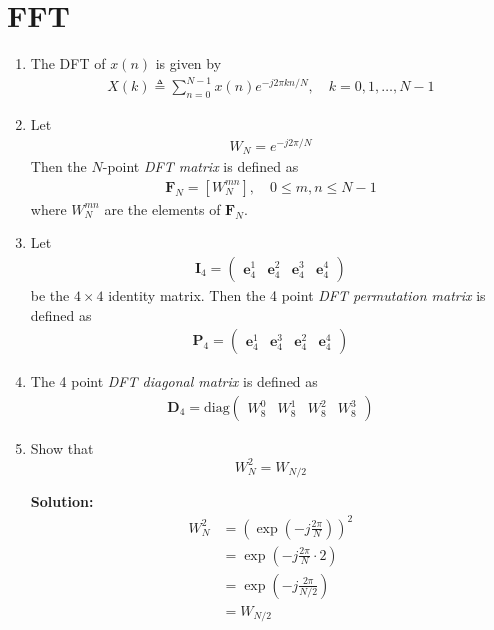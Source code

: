 \documentclass[journal,12pt,twocolumn]{IEEEtran}
\newcommand{\solution}{\noindent \textbf{Solution: }}
\providecommand{\brak}[1]{\ensuremath{\left(#1\right)}}
\providecommand{\sbrak}[1]{\ensuremath{\left[#1\right]}}
\let\vec\mathbf
\numberwithin{equation}{section}
\renewcommand\thesection{\arabic{section}}
\newcommand{\myvec}[1]{\ensuremath{\begin{pmatrix}#1\end{pmatrix}}}
\begin{document}
	\section{FFT}
	\begin{enumerate}[label=\thesection.\arabic*]
	\item The DFT of $x(n)$ is given by
    \begin{align}
        X(k) \triangleq \sum_{n=0}^{N-1} x(n) e^{-j 2 \pi k n / N}, \quad k=0,1, \ldots, N-1
    \end{align}
	
	\item Let 
	\begin{align}
		W_{N} = e^{-j2\pi/N} 
	\end{align}
		Then the $N$-point {\em DFT matrix} is defined as 
	\begin{align}
		\vec{F}_{N} = \sbrak{W_{N}^{mn}}, \quad 0 \le m,n \le N-1 
	\end{align}
	where $W_{N}^{mn}$ are the elements of $\vec{F}_{N}$.
	
	\item Let 
	\begin{align}
		\vec{I}_4 = \myvec{\vec{e}_4^{1} &\vec{e}_4^{2} &\vec{e}_4^{3} &\vec{e}_4^{4} }
	\end{align}
		be the $4\times 4$ identity matrix.  Then the 4 point {\em DFT permutation matrix} is defined as 
	\begin{align}
		\vec{P}_4 = \myvec{\vec{e}_4^{1} &\vec{e}_4^{3} &\vec{e}_4^{2} &\vec{e}_4^{4} }
	\end{align}
	
	\item The 4 point {\em DFT diagonal matrix} is defined as 
	\begin{align}
		\vec{D}_4 = \mathrm{diag}\myvec{W_{8}^{0} & W_{8}^{1} & W_{8}^{2} & W_{8}^{3}}
	\end{align}
	
	\item Show that 
	\begin{equation}
    		W_{N}^{2}=W_{N/2}
	\end{equation}
	
	\solution
	\begin{align}
		W_N^2 &= \brak{\exp\brak{-j\frac{2\pi}{N}}}^2	 \\
		&= \exp\brak{-j\frac{2\pi}{N} \cdot 2} \\
		&= \exp\brak{-j\frac{2\pi}{N/2}} \\
		&= W_{N/2}
	\end{align}	 
	

\end{enumerate}
\end{document}
